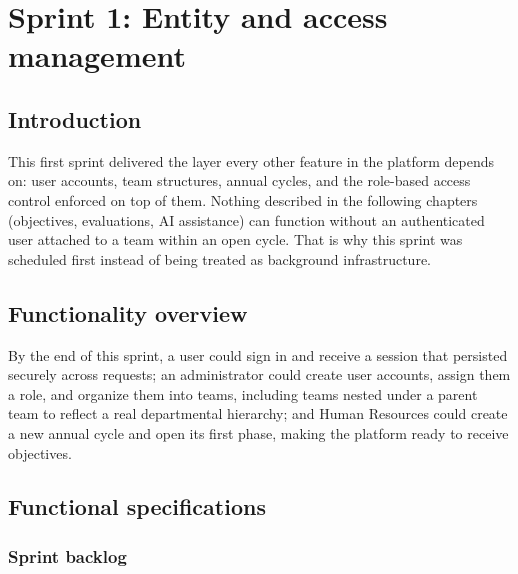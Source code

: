 \documentclass[12pt,a4paper]{report}
\begin{document}
\chapter{Sprint 1: Entity and access management}
\label{ch:sprint1}

\section{Introduction}

This first sprint delivered the layer every other feature in the platform depends on: user accounts, team structures, annual cycles, and the role-based access control enforced on top of them. Nothing described in the following chapters (objectives, evaluations, AI assistance) can function without an authenticated user attached to a team within an open cycle. That is why this sprint was scheduled first instead of being treated as background infrastructure.

\section{Functionality overview}

By the end of this sprint, a user could sign in and receive a session that persisted securely across requests; an administrator could create user accounts, assign them a role, and organize them into teams, including teams nested under a parent team to reflect a real departmental hierarchy; and Human Resources could create a new annual cycle and open its first phase, making the platform ready to receive objectives.

\section{Functional specifications}

\subsection{Sprint backlog}
\end{document}
